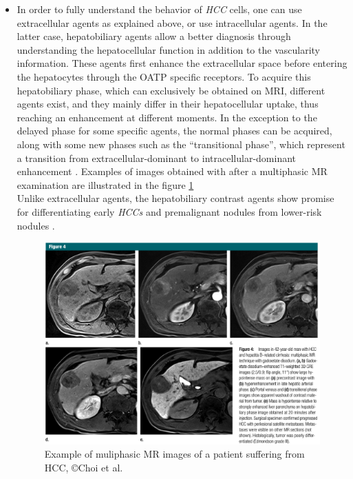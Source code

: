 \documentclass[]{article}
\begin{document}
\begin{itemize}
\item In order to fully understand the behavior of \emph{HCC} cells, one can
  use extracellular agents as explained above, or use intracellular
  agents. In the latter case, hepatobiliary agents allow a better
  diagnosis through understanding the hepatocellular function in
  addition to the vascularity information. These agents first enhance
  the extracellular space before entering the hepatocytes through the
  OATP specific receptors. To acquire this hepatobiliary phase, which
  can exclusively be obtained on MRI, different agents exist, and they
  mainly differ in their hepatocellular uptake, thus reaching an
  enhancement at different moments. In the exception to the delayed
  phase for some specific agents, the normal phases can be acquired,
  along with some new phases such as the ``transitional phase'', which
  represent a transition from extracellular-dominant to
  intracellular-dominant enhancement \cite{Nakamura2011}. Examples of images obtained with after a multiphasic MR examination are illustrated in the figure \ref{Choi2014a_Fig4} \\
  Unlike extracellular agents, the hepatobiliary contrast agents show
  promise for differentiating early \emph{HCCs} and premalignant nodules
  from lower-risk nodules \cite{Takayama2012,Kumada2011,Kobayashi2012,Kim2012b,Hyodo2013,Park2012,Kim2009}.\\
  
\begin{figure}[th!]
\centering
\includegraphics[width=0.7\linewidth]{images/image12}
\caption{Example of muliphasic MR images of a patient suffering from HCC, ©Choi et al. \cite{Choi2014a}}
\label{Choi2014a_Fig4}
\end{figure}
\end{itemize}
\end{document}
